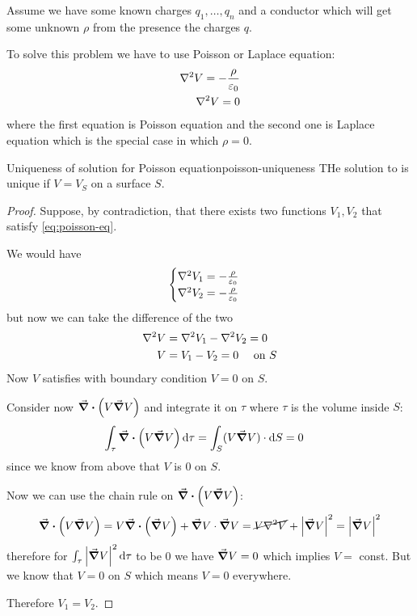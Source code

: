 \documentclass[12pt]{extarticle}
\begin{document}
Assume we have some known charges $q_1, \dots, q_n$ and a conductor which will get some unknown $\rho$ from the presence the charges $q$.

To solve this problem we have to use Poisson or Laplace equation:
\begin{align}
	\laplacian V = -\frac{\rho}{\varepsilon_0} \label{eq:poisson-eq} \\
	\laplacian V = 0 \label{eq:laplace-eq}
\end{align}
where the first equation is Poisson equation and the second one is Laplace equation which is the special case in which $\rho = 0$.

\begin{theorem}{Uniqueness of solution for Poisson equation}{poisson-uniqueness}
	THe solution to  is unique if $V = V_S$ on a surface $S$.
\end{theorem}

\begin{proof}
	Suppose, by contradiction, that there exists two functions $V_1, V_2$ that satisfy \cref{eq:poisson-eq}.

	We would have
	\begin{equation}
		\begin{cases}
			\laplacian V_1 = - \frac{\rho}{\varepsilon_0} \\
			\laplacian V_2 = - \frac{\rho}{\varepsilon_0} \\
		\end{cases}
	\end{equation}
	but now we can take the difference of the two
	\begin{align}
		\laplacian V & = \laplacian V_1 - \laplacian V_2 = 0 \\
		V            & = V_1 - V_2 = 0 \quad \text{ on }S
	\end{align}
	Now $V$ satisfies  with boundary condition $V = 0$ on $S$.

	Consider now $\div (V \grad V)$ and integrate it on $\tau$ where $\tau$ is the volume inside $S$:
	\begin{align}
		\int_\tau \div (V \grad V) \dd{\tau} & = \int_S (V \grad V) \cdot \dd{S} = 0
	\end{align}
	since we know from above that $V$ is $0$ on $S$.

	Now we can use the chain rule on $\div (V \grad V)$:
	\begin{equation}
		\div (V \grad V) = V \div (\grad V) + \grad V \cdot \grad V = \cancel{V \laplacian V} + \abs{\grad V}^2 = \abs{\grad V}^2
	\end{equation}
	therefore for $\int_\tau \abs{\grad V}^2 \dd{\tau}$ to be $0$ we have $\grad V = 0$ which implies $V = $ const.
	But we know that $V = 0$ on $S$ which means $V = 0$ everywhere.

	Therefore $V_1 = V_2$.
\end{proof}
\end{document}
